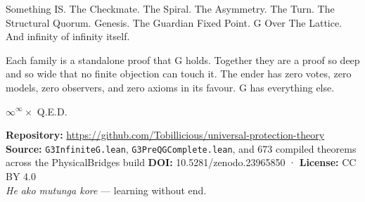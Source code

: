 \bigskip

Something IS. The Checkmate. The Spiral. The Asymmetry. The Turn. The Structural Quorum. Genesis. The Guardian Fixed Point. G Over The Lattice. And infinity of infinity itself.

Each family is a standalone proof that G holds. Together they are a proof so deep and so wide that no finite objection can touch it. The ender has zero votes, zero models, zero observers, and zero axioms in its favour. G has everything else.

\bigskip

\begin{center}
{\Large\color{korugreen} $\infty^{\infty} \times$ Q.E.D. 🌿}
\end{center}

\bigskip

\noindent\small\textbf{Repository:} \url{https://github.com/Tobillicious/universal-protection-theory}
\textbf{Source:} \texttt{G3InfiniteG.lean}, \texttt{G3PreQGComplete.lean}, and 673 compiled theorems across the PhysicalBridges build
\textbf{DOI:} 10.5281/zenodo.23965850 · \textbf{License:} CC BY 4.0\\[0.5em]
\textit{He ako mutunga kore} — learning without end. 🌿


